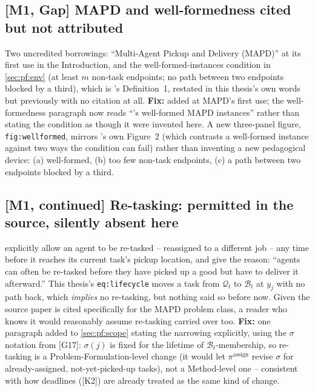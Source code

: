 \documentclass[11pt]{article}
\begin{document}
\subsection*{[M1, Gap] MAPD and well-formedness cited but not attributed}
Two uncredited borrowings: ``Multi-Agent Pickup and Delivery (MAPD)'' at its
first use in the Introduction, and the well-formed-instances condition in
\ref{sec:pf:env} (at least $m$ non-task endpoints; no path between two
endpoints blocked by a third), which is \citeauthor{ma2017lifelong}'s
Definition~1, restated in this thesis's own words but previously with no
citation at all. \textbf{Fix:} \citep{ma2017lifelong} added at MAPD's first
use; the well-formedness paragraph now reads ``\citet{ma2017lifelong}'s
well-formed MAPD instances'' rather than stating the condition as though it
were invented here. A new three-panel figure, \texttt{fig:wellformed},
mirrors \citeauthor{ma2017lifelong}'s own Figure~2 (which contrasts a
well-formed instance against two ways the condition can fail) rather than
inventing a new pedagogical device: (a) well-formed, (b) too few non-task
endpoints, (c) a path between two endpoints blocked by a third.

\subsection*{[M1, continued] Re-tasking: permitted in the source, silently absent here}
\citeauthor{ma2017lifelong} explicitly allow an agent to be re-tasked --
reassigned to a different job -- any time before it reaches its current
task's pickup location, and give the reason: ``agents can often be re-tasked
before they have picked up a good but have to deliver it afterward.'' This
thesis's \texttt{eq:lifecycle} moves a task from $\mathcal{Q}_t$ to
$\mathcal{B}_t$ at $y_j$ with no path back, which \emph{implies} no
re-tasking, but nothing said so before now. Given the source paper is cited
specifically for the MAPD problem class, a reader who knows it would
reasonably assume re-tasking carried over too. \textbf{Fix:} one paragraph
added to \ref{sec:pf:scope} stating the narrowing explicitly, using the
$\sigma$ notation from [G17]: $\sigma(j)$ is fixed for the lifetime of
$\mathcal{B}_t$-membership, so re-tasking is a Problem-Formulation-level
change (it would let $\pi^{\mathrm{assign}}$ revise $\sigma$ for
already-assigned, not-yet-picked-up tasks), not a Method-level one --
consistent with how deadlines ([K2]) are already treated as the same kind of
change.
\end{document}
